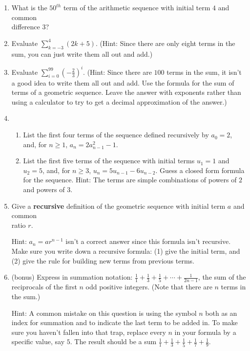 \documentclass[11pt]{amsart}
\begin{document}
\begin{enumerate}

\item  What is the $50^{th}$ term of the arithmetic sequence with initial
term $4$ and common\\
 difference $3$?\\[5pt]


\item Evaluate $\displaystyle\sum_{k=-3}^{4} (2k+5)$. (Hint: Since there are only eight terms in the sum, you can just write
them all out and add.)\\[5pt]

\item   Evaluate $\displaystyle \sum_{i=0}^{99} \left(-\frac{2}{3}\right)^i$. (Hint: Since there are $100$ terms in the sum, it isn't a good idea to write them all out and add. Use the formula for the sum of terms of a geometric sequence. Leave the answer with exponents rather than using a calculator to try to get a decimal approximation of the answer.) \\[5pt]

\item 
\begin{enumerate}

\item List the first four terms of the sequence defined recursively by
 $a_0 = 2$, and, for $n\geq 1$, $a_n = 2a_{n-1}^2 -1$.\\[3pt]

\item List the first five terms of the sequence with initial terms
$u_1=1$ and $u_2=5$, and, for $n\geq 3$, $u_n = 5u_{n-1}-6u_{n-2}$.
Guess a closed form formula for the sequence.
Hint: The terms
are simple combinations of powers of $2$ and powers of $3$.\\[5pt]

\end{enumerate}

\item  Give a {\bf recursive} definition of the geometric sequence
with initial term $a$ and common\\
 ratio $r$. 

Hint: $a_{n} = a r^{n-1}$ isn't a correct answer since this formula isn't recursive.
Make sure you write down a recursive formula: (1) give the initial term, and 
(2) give the rule for building new terms from previous terms.\\[5pt]

\item (bonus) Express in summation notation: $\displaystyle  \frac{1}{1}+\frac{1}{3}+\frac{1}{5}+
\cdots+\frac{1}{2n-1}$, the sum of the reciprocals of the first $n$ odd
positive integers. (Note that there are $n$ terms in the sum.)

Hint: A common mistake on this question is using the symbol $n$ both as an index for summation
and to indicate the last term to be added in. To make sure you haven't fallen into that trap, replace every
$n$ in your formula by a specific value, say $5$. The result should be a sum
  $\displaystyle  \frac{1}{1}+\frac{1}{3}+\frac{1}{5}+\frac{1}{7}+\frac{1}{9}$.

 \end{enumerate}
 
\end{document}
